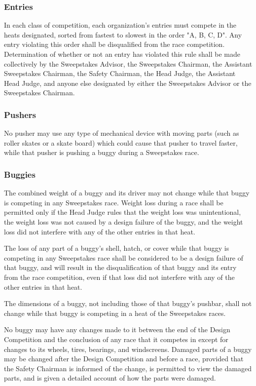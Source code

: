 \subsubsection{Entries}

	In each class of competition, each organization's entries must compete in the
	heats designated, sorted from fastest to slowest in the order "A, B, C, D". 
	Any entry violating this order shall be disqualified from the race competition. 
	Determination of whether or not an entry has violated this rule shall be made 
	collectively by the	Sweepstakes Advisor, the Sweepstakes Chairman, the 
	Assistant Sweepstakes Chairman, the Safety Chairman, the Head Judge, the 
	Assistant Head Judge, and anyone else designated by either the Sweepstakes 
	Advisor or the Sweepstakes Chairman.

\subsubsection{Pushers}

	No pusher may use any type of mechanical device with moving parts (such as
	roller skates or a skate board) which could cause that pusher to travel faster,
	while that pusher is pushing a buggy during a Sweepstakes race.

\subsubsection{Buggies}

	The combined weight of a buggy and its driver may not change while that buggy
	is competing in any Sweepstakes race. Weight loss during a race shall be
	permitted only if the Head Judge rules that the weight loss was unintentional,
	the weight loss was not caused by a design failure of the buggy, and the weight
	loss did not interfere with any of the other entries in that heat.

	The loss of any part of a buggy's shell, hatch, or cover while that buggy is
	competing in any Sweepstakes race shall be considered to be a design failure of
	that buggy, and will result in the disqualification of that buggy and its entry
	from the race competition, even if that loss did not interfere with any of the
	other entries in that heat.

	The dimensions of a buggy, not including those of that buggy's pushbar, shall
	not change while that buggy is competing in a heat of the Sweepstakes races.

	No buggy may have any changes made to it between the end of the Design
	Competition and the conclusion of any race that it competes in except for
	changes to its wheels, tires, bearings, and windscreens. Damaged parts of a
	buggy may be changed after the Design Competition and before a race, provided
	that the Safety Chairman is informed of the change, is permitted to view the
	damaged parts, and is given a detailed account of how the parts were damaged.

